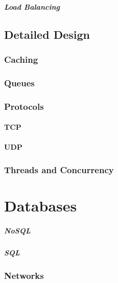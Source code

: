 \documentclass[a4paper, 11pt]{book}
\begin{document}
    \paragraph{Load Balancing}

    \section{Detailed Design}

    \subsection{Caching}

    \subsection{Queues}

    \subsection{Protocols}

    \subsubsection{TCP}

    \subsubsection{UDP}

    \subsection{Threads and Concurrency}

    \chapter{Databases}

    \paragraph{NoSQL}

    \paragraph{SQL}

    \subsection{Networks}
\end{document}

